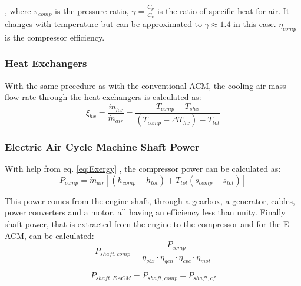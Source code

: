 \documentclass[english]{kththesis}
\begin{document}
, where $\pi_{comp}$ is the pressure ratio, $\gamma = \frac{C_p}{C_v}$ is the ratio of specific heat for air. It changes with temperature but can be approximated to $\gamma \approx 1.4$ in this case. $\eta_{comp}$ is the compressor efficiency.



\subsubsection{Heat Exchangers}
\label{subsubsec:EACMHx}
With the same precedure as with the conventional ACM, the cooling air mass flow rate through the heat exchangers is calculated as:
\begin{equation}
\label{eq:ECMHx}
\xi_{hx} = \frac{\dot{m}_{hx}}{\dot{m}_{air}} = \frac{T_{comp}-T_{shx}}{(T_{comp}-\Delta T_{hx})-T_{tot}}
\end{equation}

\subsubsection{Electric Air Cycle Machine Shaft Power}
\label{subsubsec:EACMShaftPower}

With help from eq. \ref{eq:Exergy} , the compressor power can be calculated as:
\begin{equation}
\label{eq:EACMPcomp}
P_{comp} = \dot{m}_{air} \left[ (h_{comp}-h_{tot}) + T_{tot} (s_{comp}-s_{tot}) \right]
\end{equation}

This power comes from the engine shaft, through a gearbox, a generator, cables, power converters and a motor, all having an efficiency less than unity. Finally shaft power, that is extracted from the engine to the compressor and for the E-ACM, can be calculated:
\begin{equation}
\label{eq:Pshaftcomp}
P_{shaft,comp} = \frac{P_{comp}}{\eta_{gbx} \cdot \eta_{gen} \cdot \eta_{cpc} \cdot \eta_{mot}}
\end{equation}

\begin{equation}
\label{eq:EACMPshaft}
P_{shaft,EACM} = P_{shaft,comp} + P_{shaft,cf}
\end{equation}
\end{document}
